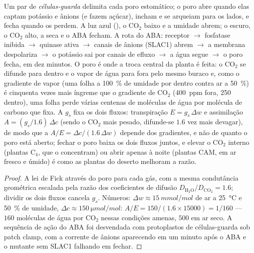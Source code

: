 \begin{proposition}\label{prop:b3:plant-molecular-physiology:stomata}
Um par de \emph{células-guarda} delimita cada poro estomático; o poro
abre quando elas captam potássio e ânions (e fazem açúcar), incham e se
arqueiam para os lados, e fecha quando os perdem. A luz azul
(), o CO$_{2}$ baixo e a umidade abrem; o escuro, o
CO$_{2}$ alto, a seca e o ABA fecham. A rota do ABA: receptor $\to$
fosfatase inibida $\to$ quinase ativa $\to$ canais de ânions (SLAC1)
abrem $\to$ a membrana despolariza $\to$ o potássio sai por canais de
efluxo $\to$ a água segue $\to$ o poro fecha, em dez minutos. O poro é
onde a troca central da planta é feita: o CO$_{2}$ se difunde para dentro
e o vapor de água para fora pelo mesmo buraco e, como o gradiente de
vapor (uma folha a \qty{100}{\%} de umidade por dentro contra ar a
\qty{50}{\%}) é cinquenta vezes mais íngreme que o gradiente de CO$_{2}$
(\qty{400}{ppm} fora, \qty{250}{} dentro), uma folha perde várias
centenas de moléculas de água por molécula de carbono que fixa. A
\emph{} $g_{s}$ fixa os dois fluxos: transpiração
$E = g_{s}\,\Delta w$ e assimilação $A = (g_{s}/1.6)\,\Delta c$ (sendo o
CO$_{2}$ mais pesado, difunde-se $1.6$ vez mais devagar), de modo que a
\emph{} $A/E = \Delta c/(1.6\,\Delta w)$ depende
dos gradientes, e não de quanto o poro está aberto; fechar o poro baixa
os dois fluxos juntos, e elevar o CO$_{2}$ interno (plantas C$_{4}$, que
o concentram) ou abrir apenas à noite (plantas CAM, em ar fresco e úmido)
é como as plantas do deserto melhoram a razão.
\end{proposition}
\begin{proof}
A lei de Fick através do poro para cada gás, com a mesma condutância
geométrica escalada pela razão dos coeficientes de difusão
$D_{\mathrm{H_2O}}/D_{\mathrm{CO_2}} = 1.6$; dividir os dois fluxos
cancela $g_{s}$. Números: $\Delta w \approx \qty{15}{mmol/mol}$ de ar a
\qty{25}{\celsius} e \qty{50}{\%} de umidade, $\Delta c \approx
\qty{150}{\micro mol/mol}$: $A/E = 150/(1.6\times\num{15000}) = 1/160$
--- $160$ moléculas de água por CO$_{2}$ nessas condições amenas, $500$
em ar seco. A sequência de ação do ABA foi desvendada com protoplastos de
células-guarda sob patch clamp, com a corrente de ânions aparecendo em um
minuto após o ABA e o mutante sem SLAC1 falhando em fechar.
\end{proof}

